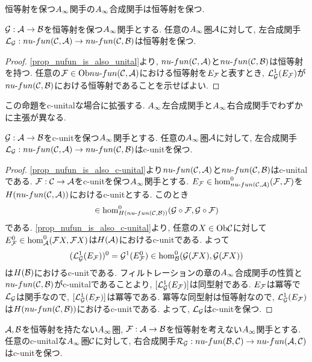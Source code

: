 \documentclass[uplatex, a4paper, 14Q, dvipdfmx]{jsarticle}
\begin{document}
恒等射を保つ$\Ainf$関手の$\Ainf$合成関手は恒等射を保つ. 

\begin{lemma}
  $\G : \A \to \B$を恒等射を保つ$\Ainf$関手とする. 
  任意の$\Ainf$圏$\A$に対して, 左合成関手$\LG : \nufun{\C}{\A} \to \nufun{\C}{\B}$は恒等射を保つ. 
\end{lemma}

\begin{proof}
  \cref{prop_nufun_is_also_unital}より, $\nufun{\C}{\A}$と$\nufun{\C}{\B}$は恒等射を持つ. 
  任意の$\F \in \Ob\nufun{\C}{\A}$における恒等射を$E_\F$と表すとき, $\LG^1(E_\F)$が$\nufun{\C}{\B}$における恒等射であることを示せばよい.

\end{proof}

この命題をc-unitalな場合に拡張する.
$\Ainf$左合成関手と$\Ainf$右合成関手でわずかに主張が異なる. 

\begin{theorem} \label{prop_LG_is_also_c_unital}
  $\G : \A \to \B$をc-unitを保つ$\Ainf$関手とする. 
  任意の$\Ainf$圏$\A$に対して, 左合成関手$\LG : \nufun{\C}{\A} \to \nufun{\C}{\B}$はc-unitを保つ. 
\end{theorem}

\begin{proof}
  \cref{prop_nufun_is_also_c-unital}より$\nufun{\C}{\A}$と$\nufun{\C}{\B}$はc-unitalである.
  $\F : \C \to \A$をc-unitを保つ$\Ainf$関手とする. 
  $E_\F \in \hom^0_{\nufun{\C}{\A}} (\F,\F)$を$H(\nufun{\C}{\A})$におけるc-unitとする. 
  このとき
  \begin{align*}
    [\LG^1(E_\F)] \in \hom^0_{H(\nufun{\C}{\B})} (\G \circ \F,\G \circ \F)
  \end{align*}
  である. 
  \cref{prop_nufun_is_also_c-unital}より, 任意の$X \in \Ob\C$に対して$E^0_\F \in \hom^0_\A(\F X,\F X)$は$H(\A)$におけるc-unitである. 
  よって 
  \begin{align*}
    (\LG^1(E_\F))^0 = \G^1(E^0_\F) \in \hom^0_\B(\G(\F X), \G(\F X))
  \end{align*}
  は$H(\B)$におけるc-unitである.
  フィルトレーションの章の$\Ainf$合成関手の性質と$\nufun{\C}{\B}$がc-unitalであることより, $[\LG^1(E_\F)]$は同型射である. 
  $E_\F$は冪等で$\LG$は関手なので, $[\LG^1(E_\F)]$は冪等である. 
  冪等な同型射は恒等射なので, $\LG^1(E_\F)$は$H(\nufun{\C}{\B})$におけるc-unitである. 
  よって, $\LG$はc-unitを保つ. 
\end{proof}  

\begin{theorem} \label{prop_RG_is_also_c_unital}
  $\A, \B$を恒等射を持たない$\Ainf$圏, $\F : \A \to \B$を恒等射を考えない$\Ainf$関手とする.  
  任意のc-unitalな$\Ainf$圏$\C$に対して, 右合成関手$\RG : \nufun{\B}{\C} \to \nufun{\A}{\C}$はc-unitを保つ.
\end{theorem}
\end{document}
